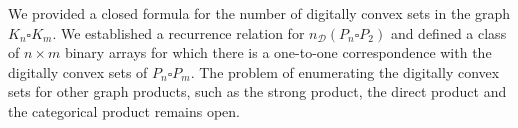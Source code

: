 \documentclass[12pt]{article}
\begin{document}
We provided a closed formula for the number of digitally convex sets in the graph $K_n\square K_m$. We established a recurrence relation for $n_\mathscr{D}(P_n\square P_2)$ and defined a class of $n\times m$ binary arrays for which there is a one-to-one correspondence with the digitally convex sets of $P_n\square P_m$. The problem of enumerating the digitally convex sets for other graph products, such as the strong product, the direct product and the categorical product remains open. 



\end{document}
